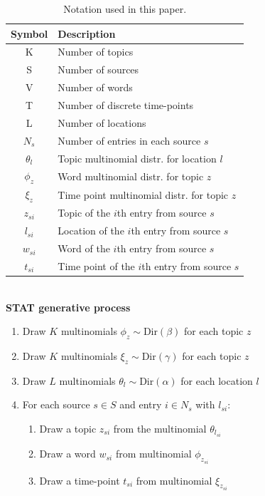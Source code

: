 \documentclass[twoside,leqno,twocolumn]{article}
\newcommand{\model}{{STAT}\xspace} %
\begin{document}
\begin{table}[h]
\small \centering
\caption{Notation used in this paper.}
\begin{tabular}{c l}
\hline
{\bf Symbol} & {\bf Description}  \\
\hline
K & Number of topics  \\
S & Number of sources \\
V & Number of words \\
T & Number of discrete time-points \\
L & Number of locations \\
$N_s$ & Number of entries in each source $s$\\
$\theta_l$ & Topic multinomial distr. for location $l$\\
$\phi_z$ & Word multinomial distr. for topic $z$\\
$\xi_z$ & Time point multinomial distr. for topic $z$\\
$z_{si}$ & Topic of the $i$th entry from source $s$ \\
$l_{si}$ & Location of the $i$th entry from source $s$ \\
$w_{si}$ & Word of the $i$th entry from source $s$ \\
$t_{si}$ & Time point of the $i$th entry from source $s$ \\
\hline
\end{tabular}
\label{tab:notation}
\end{table}

\ \\{\bf \model generative process}
\begin{enumerate}[noitemsep]
\item Draw $K$ multinomials $\phi_z\sim\mbox{Dir}(\beta)$ for each topic $z$
\item Draw $K$ multinomials $\xi_z\sim\mbox{Dir}(\gamma)$ for each topic $z$
\item Draw $L$ multinomials $\theta_l\sim\mbox{Dir}(\alpha)$ for each location $l$
\item For each source  $s \in S$ and entry $i \in N_s$ with $l_{si}$:
\begin{enumerate}
\item Draw a topic $z_{si}$ from the multinomial $\theta_{l_{si}}$
\item Draw a word $w_{si}$ from multinomial $\phi_{z_{si}}$
\item Draw a time-point $t_{si}$ from multinomial $\xi_{z_{si}}$
\end{enumerate}
\end{enumerate}
\end{document}
